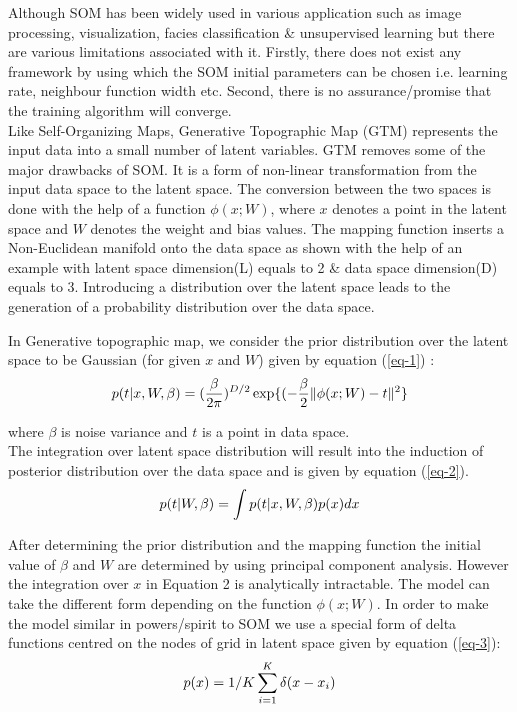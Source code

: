 \documentclass[a4paper]{article}
\begin{document}
Although SOM has been widely used in various application such as image processing, visualization, facies classification \& unsupervised learning but there are various limitations associated with it. Firstly, there does not exist any framework by using which the SOM initial parameters can be chosen i.e. learning rate, neighbour function width etc. Second, there is no assurance/promise that the training algorithm will converge.\\

Like Self-Organizing Maps, Generative Topographic Map (GTM)\cite{gtm} represents the input data into a small number of latent variables. GTM removes some of the major drawbacks of SOM. It is a form of non-linear transformation from the input data space to the latent space. The conversion between the two spaces is done with the help of a function $ \phi(x; W)$, where $x$ denotes a point in the latent space and $W$ denotes the weight and bias values. The mapping function inserts a Non-Euclidean manifold onto the data space as shown with the help of an example with latent space dimension(L) equals to 2 \& data space dimension(D) equals to 3. Introducing a distribution over the latent space leads to the generation of a probability distribution over the data space.


 
In Generative topographic map, we consider the prior distribution over the latent space to be Gaussian\cite{gtm} (for given $x$ and $W$) given by equation (\ref{eq-1}) :
\begin{equation}
 p(t|x,W,\beta)=(\frac{\beta}{2\pi})^{D/2} \exp\{(-\frac{\beta}{2}\Arrowvert\phi(x;W)-t\Arrowvert^{2}\} \label{eq-1}
\end{equation}
 
where $\beta$ is noise variance and $t$ is a point in data space.\\
The integration over latent space distribution will result into the induction of posterior distribution\cite{gtm} over the data space and is given by equation (\ref{eq-2}).
\smallbreak
\begin{equation}
p(t|W,\beta)= \int p(t|x,W,\beta)p(x) dx \label{eq-2} \\
\end{equation}


After determining the prior distribution and the mapping function the initial value of $\beta$ and $W$ are determined by using principal component analysis\cite{pca}. However the integration over $x$ in Equation 2 is analytically intractable. The model can take the different form depending on the function $\phi(x;W)$. In order to make the model similar in powers/spirit to SOM we use a special form of delta functions centred on the nodes of grid in latent space\cite{gtm1} given by equation (\ref{eq-3}):
 \begin{equation}
 p(x)= 1/K \sum\limits_{i=1}^{K} \delta(x-x_{i}) \label{eq-3} \\
 \end{equation}
\end{document}
